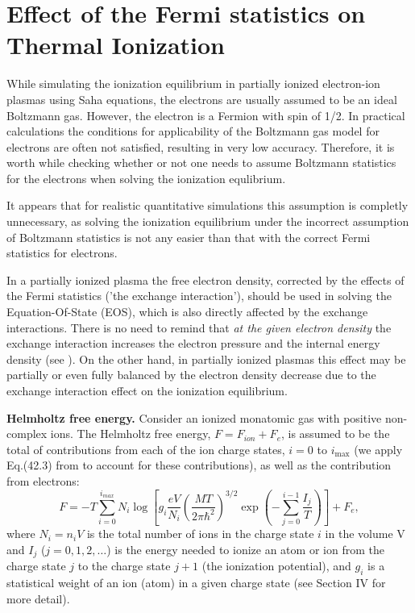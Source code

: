 
\section{Effect of the Fermi statistics on Thermal Ionization}

While simulating the ionization equilibrium in partially ionized electron-ion plasmas using Saha 
equations, the electrons are usually assumed to be an ideal Boltzmann gas.  However, the electron is a Fermion with spin of 1/2. In practical calculations the conditions for
applicability of the Boltzmann gas model for electrons are often not satisfied, resulting in
very low accuracy. Therefore, it is worth while checking whether or not one needs to assume Boltzmann statistics for the electrons when solving the ionization equlibrium.

It appears that for realistic quantitative simulations this assumption is completly 
unnecessary, as solving the ionization equilibrium under the incorrect assumption of 
Boltzmann statistics is not any easier than that with the correct Fermi statistics for 
electrons.

In a partially ionized plasma the free electron density, corrected by the effects of the Fermi statistics 
('the exchange interaction'), should be used in solving the Equation-Of-State (EOS), which is also 
directly affected by the exchange interactions. There is no need to remind that 
{\it at the given electron density} the exchange interaction increases the electron pressure and the 
internal energy density (see \cite{ll}). On the other hand, in partially ionized plasmas this effect may 
be partially or even fully balanced by the electron density decrease due to the exchange interaction 
effect on the ionization equilibrium.  

{\bf Helmholtz free energy.} Consider an ionized monatomic gas with positive non-complex ions. The Helmholtz free energy,
$F=F_{ion}+F_e$, is assumed to be the total of contributions from each of the ion charge states,
$i=0$ to $i_{\max}$ (we apply Eq.(42.3) from \cite{ll} to account for these contributions), as well as the contribution from electrons:
\begin{equation}\label{freeenergy}
F=-T
\sum_{i=0}^{i_{max}}{
N_i\log\left[g_i
             \frac{eV}{N_i}\left(\frac{MT}{2\pi \hbar^2}\right)^{3/2}\exp \left(-\sum_{j=0}^{i-1}\frac{I_j}T \right)\right]}+F_e,
\end{equation}  
where $N_i=n_iV$ is the total number of ions in the charge state $i$ in the volume V and
$I_j$ ($j = 0, 1, 2, \dots$) is the energy needed to ionize an atom or ion from the charge state $j$ to the charge state $j+1$ (the ionization potential), and $g_i$ is a 
statistical weight of an ion (atom) in a given charge state 
(see Section IV for more detail).

